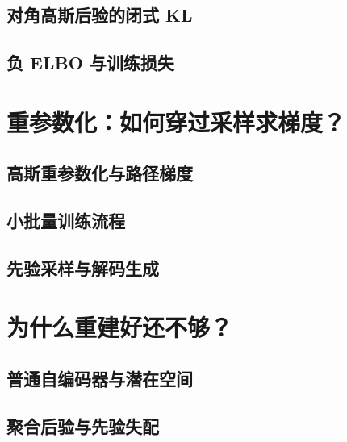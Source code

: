 \subsection{对角高斯后验的闭式 KL}
\label{subsec:vae-gaussian-kl}
\contentplaceholder

\subsection{负 ELBO 与训练损失}
\label{subsec:vae-negative-elbo}
\contentplaceholder

\section{重参数化：如何穿过采样求梯度？}
\label{sec:vae-reparameterization}
\contentplaceholder

\subsection{高斯重参数化与路径梯度}
\label{subsec:vae-pathwise}
\contentplaceholder

\subsection{小批量训练流程}
\label{subsec:vae-training}
\contentplaceholder

\subsection{先验采样与解码生成}
\label{subsec:vae-generation}
\contentplaceholder

\section{为什么重建好还不够？}
\label{sec:vae-reconstruction}
\contentplaceholder

\subsection{普通自编码器与潜在空间}
\label{subsec:vae-autoencoder}
\contentplaceholder

\subsection{聚合后验与先验失配}
\label{subsec:vae-aggregated-posterior}
\contentplaceholder

